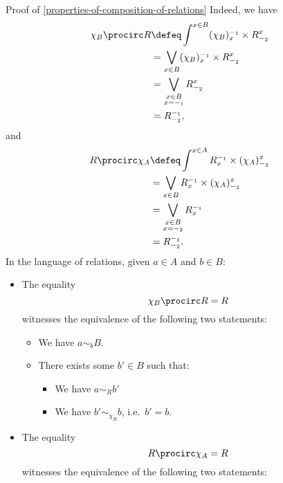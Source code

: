 \begin{Proof}{Proof of \cref{properties-of-composition-of-relations}}
    Indeed, we have
    \begin{align*}
        \chi_{B}\procirc R &\defeq \int^{x\in B}(\chi_{B})^{-_{1}}_{x}\times R^{x}_{-_{2}}\\
                           &=      \bigvee_{x\in B}(\chi_{B})^{-_{1}}_{x}\times R^{x}_{-_{2}}\\
                           &=      \bigvee_{\substack{x\in B\\x=-_{1}}}R^{x}_{-_{2}}\\
                           &=      R^{-_{1}}_{-_{2}},
    \end{align*}
    and
    \begin{align*}
        R\procirc\chi_{A} &\defeq \int^{x\in A}R^{-_{1}}_{x}\times(\chi_{A})^{x}_{-_{2}}\\
                          &=      \bigvee_{x\in B}R^{-_{1}}_{x}\times(\chi_{A})^{x}_{-_{2}}\\
                          &=      \bigvee_{\substack{x\in B\\x=-_{2}}}R^{-_{1}}_{x}\\
                          &=      R^{-_{1}}_{-_{2}}.
    \end{align*}
    In the language of relations, given $a\in A$ and $b\in B$:
    \begin{itemize}
        \item The equality
            \[
                \chi_{B}\procirc R%
                =%
                R%
            \]%
            witnesses the equivalence of the following two statements:
            \begin{itemize}
                \item We have $a\sim_{b}B$.
                \item There exists some $b'\in B$ such that:
                    \begin{itemize}
                        \item We have $a\sim_{R}b'$
                        \item We have $b'\sim_{\chi_{B}}b$, i.e.\ $b'=b$.
                    \end{itemize}
            \end{itemize}
        \item The equality
            \[
                R\procirc\chi_{A}%
                =%
                R%
            \]%
            witnesses the equivalence of the following two statements:

\end{itemize}
\end{Proof}
